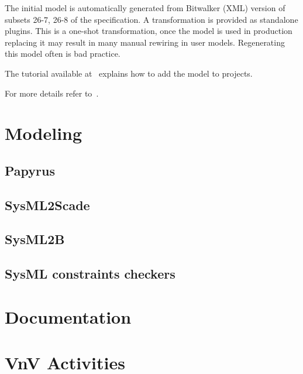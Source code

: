 \documentclass{template/openetcs_report}
\begin{document}
    The initial model is automatically generated from Bitwalker (XML)
    version of subsets 26-7, 26-8 of the specification. A
    transformation is provided as standalone plugins. This is a
    one-shot transformation, once the model is used in production
    replacing it may result in many manual rewiring in user
    models. Regenerating this model often is bad practice.

    The tutorial available at~\cite{datadictionary::tutorial} explains
    how to add the model to projects.

    For more details refer to~\cite{datadictionary::wiki}. 


  \section{Modeling}
\label{sec:model}
    \subsection{Papyrus}
    \subsection{SysML2Scade}
    \subsection{SysML2B}
    \subsection{SysML constraints checkers}

  \section{Documentation}
  \label{sec:doc}

  \section{VnV Activities}
  \label{sec:doc}
\end{document}
